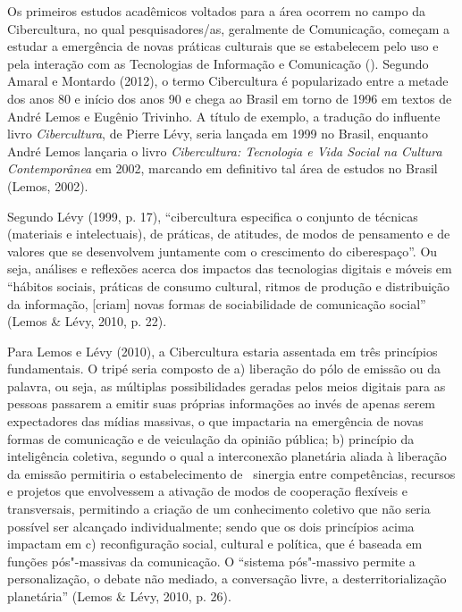 Os primeiros estudos acadêmicos voltados para a área ocorrem no campo da
Cibercultura, no qual pesquisadores/as, geralmente de Comunicação,
começam a estudar a emergência de novas práticas culturais que se
estabelecem pelo uso e pela interação com as Tecnologias de Informação e
Comunicação (). Segundo Amaral e Montardo (2012), o termo
Cibercultura é popularizado entre a metade dos anos 80 e início dos anos
90 e chega ao Brasil em torno de 1996 em textos de André Lemos e Eugênio
Trivinho. A título de exemplo, a tradução do influente livro
\emph{Cibercultura}, de Pierre Lévy, seria lançada em 1999 no Brasil,
enquanto André Lemos lançaria o livro \emph{Cibercultura: Tecnologia e
Vida Social na Cultura Contemporânea} em 2002, marcando em definitivo
tal área de estudos no Brasil (Lemos, 2002).

Segundo Lévy (1999, p. 17), ``cibercultura especifica o conjunto de
técnicas (materiais e intelectuais), de práticas, de atitudes, de modos
de pensamento e de valores que se desenvolvem juntamente com o
crescimento do ciberespaço''. Ou seja, análises e reflexões acerca dos
impactos das tecnologias digitais e móveis em ``hábitos sociais,
práticas de consumo cultural, ritmos de produção e distribuição da
informação, {[}criam{]} novas formas de sociabilidade de comunicação
social'' (Lemos \& Lévy, 2010, p. 22).

Para Lemos e Lévy (2010), a Cibercultura estaria assentada em três
princípios fundamentais. O tripé seria composto de a) liberação do pólo
de emissão ou da palavra, ou seja, as múltiplas possibilidades geradas
pelos meios digitais para as pessoas passarem a emitir suas próprias
informações ao invés de apenas serem expectadores das mídias massivas, o
que impactaria na emergência de novas formas de comunicação e de
veiculação da opinião pública; b) princípio da inteligência coletiva,
segundo o qual a interconexão planetária aliada à liberação da emissão
permitiria o estabelecimento de ~sinergia entre competências, recursos e
projetos que envolvessem a ativação de modos de cooperação flexíveis e
transversais, permitindo a criação de um conhecimento coletivo que não
seria possível ser alcançado individualmente; sendo que os dois
princípios acima impactam em c) reconfiguração social, cultural e
política, que é baseada em funções pós"-massivas da comunicação. O
``sistema pós"-massivo permite a personalização, o debate não mediado, a
conversação livre, a desterritorialização planetária'' (Lemos \& Lévy,
2010, p. 26).

